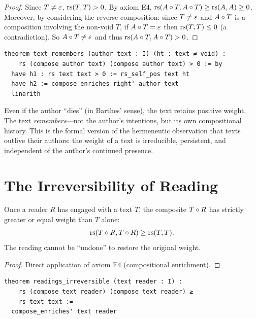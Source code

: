 \begin{proof}
Since $T \neq \varepsilon$, $\mathrm{rs}(T, T) > 0$.  By axiom E4,
$\mathrm{rs}(A \circ T, A \circ T) \geq \mathrm{rs}(A, A) \geq 0$.
Moreover, by considering the reverse composition:
since $T \neq \varepsilon$ and $A \circ T$ is a composition involving
the non-void $T$, if $A \circ T = \varepsilon$ then $\mathrm{rs}(T, T) \leq 0$
(a contradiction).  So $A \circ T \neq \varepsilon$ and thus
$\mathrm{rs}(A \circ T, A \circ T) > 0$.
\end{proof}

\begin{lstlisting}
theorem text_remembers (author text : I) (ht : text ≠ void) :
    rs (compose author text) (compose author text) > 0 := by
  have h1 : rs text text > 0 := rs_self_pos text ht
  have h2 := compose_enriches_right' author text
  linarith
\end{lstlisting}

\begin{remark}
Even if the author ``dies'' (in Barthes' sense), the text retains
positive weight.  The text \emph{remembers}---not the author's
intentions, but its own compositional history.  This is the formal
version of the hermeneutic observation that texts outlive their authors:
the weight of a text is irreducible, persistent, and independent of
the author's continued presence.
\end{remark}

\section{The Irreversibility of Reading}

\begin{theorem}
\label{thm:reading-irreversible}
Once a reader $R$ has engaged with a text $T$, the composite
$T \circ R$ has strictly greater or equal weight than $T$ alone:
\[
  \mathrm{rs}(T \circ R, T \circ R) \geq \mathrm{rs}(T, T).
\]
The reading cannot be ``undone'' to restore the original weight.
\end{theorem}

\begin{proof}
Direct application of axiom E4 (compositional enrichment).
\end{proof}

\begin{lstlisting}
theorem readings_irreversible (text reader : I) :
    rs (compose text reader) (compose text reader) ≥
    rs text text :=
  compose_enriches' text reader
\end{lstlisting}

